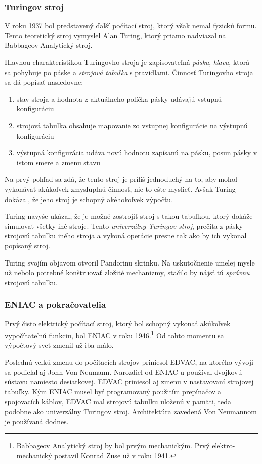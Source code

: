 \subsubsection{Turingov stroj}

V roku 1937 bol predstavený ďalší počítací stroj, ktorý však nemal fyzickú formu. Tento teoretický stroj vymyslel Alan Turing, ktorý priamo nadviazal na Babbageov Analytický stroj.

Hlavnou charakteristikou Turingovho stroja je zapisovateľná \emph{páska}, \emph{hlava}, ktorá sa pohybuje po páske a \emph{strojová tabuľka} s pravidlami. Činnosť Turingovho stroja sa dá popísať nasledovne:
\begin{enumerate}
  \item stav stroja a hodnota z aktuálneho políčka pásky udávajú vstupnú konfiguráciu
  \item strojová tabuľka obsahuje mapovanie zo vstupnej konfigurácie na výstupnú konfiguráciu
  \item výstupná konfigurácia udáva novú hodnotu zapísanú na pásku, posun pásky v istom smere a zmenu stavu
\end{enumerate}

Na prvý pohľad sa zdá, že tento stroj je príliš jednoduchý na to, aby mohol vykonávať akúkoľvek zmysluplnú činnosť, nie to ešte myslieť. Avšak Turing dokázal, že jeho stroj je schopný akéhokoľvek výpočtu.\autocite{Turing1936}

Turing navyše ukázal, že je možné zostrojiť stroj s takou tabuľkou, ktorý dokáže simulovať všetky iné stroje. Tento \emph{univerzálny Turingov stroj}, prečíta z pásky strojovú tabuľku iného stroja a vykoná operácie presne tak ako by ich vykonal popísaný stroj.

Turing svojím objavom otvoril Pandorinu skrinku. Na uskutočnenie umelej mysle už nebolo potrebné konštruovať zložité mechanizmy, stačilo by nájsť tú \emph{správnu} strojovú tabuľku.

\subsubsection{ENIAC a pokračovatelia}

Prvý čisto elektrický počítací stroj, ktorý bol schopný vykonať akúkoľvek vypočítateľnú funkciu, bol ENIAC v roku 1946.\footnote{Babbageov Analytický stroj by bol prvým mechanickým. Prvý elektro-mechanický postavil Konrad Zuse už v roku 1941.} Od tohto momentu sa výpočtový svet zmenil už iba málo.

Poslednú veľkú zmenu do počítacích strojov priniesol EDVAC, na ktorého vývoji sa podieľal aj John Von Neumann. Narozdiel od ENIAC-u používal dvojkovú sústavu namiesto desiatkovej. EDVAC priniesol aj zmenu v nastavovaní strojovej tabuľky. Kým ENIAC musel byť programovaný použitím prepínačov a spojovacích káblov, EDVAC mal strojovú tabuľku uloženú v pamäti, teda podobne ako univerzálny Turingov stroj. Architektúra zavedená Von Neumannom je používaná dodnes.


